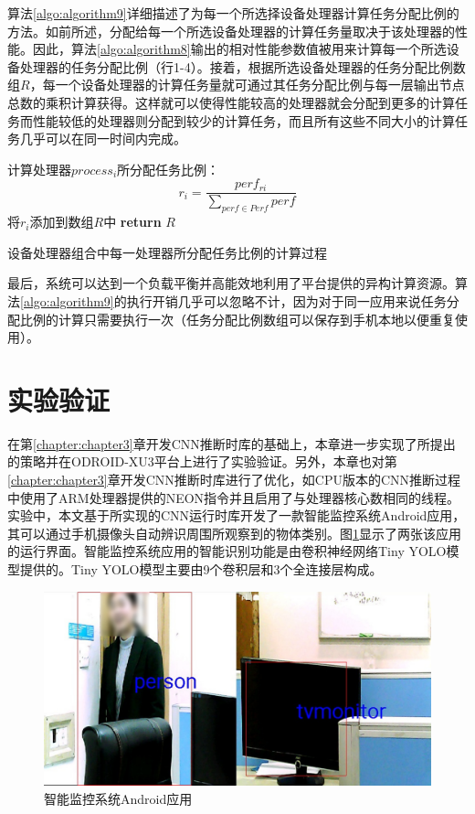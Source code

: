 算法\ref{algo:algorithm9}详细描述了为每一个所选择设备处理器计算任务分配比例的方法。如前所述，分配给每一个所选设备处理器的计算任务量取决于该处理器的性能。因此，算法\ref{algo:algorithm8}输出的相对性能参数值被用来计算每一个所选设备处理器的任务分配比例（行1-4）。接着，根据所选设备处理器的任务分配比例数组$R$，每一个设备处理器的计算任务量就可通过其任务分配比例与每一层输出节点总数的乘积计算获得。这样就可以使得性能较高的处理器就会分配到更多的计算任务而性能较低的处理器则分配到较少的计算任务，而且所有这些不同大小的计算任务几乎可以在同一时间内完成。

\begin{algorithm}[htbp]
  \small
  \SetAlgoLined
    \begin{spacing}{0.9}
     {
        计算处理器$process_i$所分配任务比例：
        $$r_i=\frac{perf_{ri}}{\sum_{perf \in Perf}perf}$$
        将$r_i$添加到数组$R$中\;
    }
    \textbf{return} $R$\;
   \end{spacing}
  \caption{设备处理器组合中每一处理器所分配任务比例的计算过程}
  \label{algo:algorithm9}
\end{algorithm}

最后，系统可以达到一个负载平衡并高能效地利用了平台提供的异构计算资源。算法\ref{algo:algorithm9}的执行开销几乎可以忽略不计，因为对于同一应用来说任务分配比例的计算只需要执行一次（任务分配比例数组可以保存到手机本地以便重复使用）。


\section{实验验证}

在第\ref{chapter:chapter3}章开发CNN推断时库的基础上，本章进一步实现了所提出的策略并在ODROID-XU3平台上进行了实验验证。另外，本章也对第\ref{chapter:chapter3}章开发CNN推断时库进行了优化，如CPU版本的CNN推断过程中使用了ARM处理器提供的NEON指令并且启用了与处理器核心数相同的线程。实验中，本文基于所实现的CNN运行时库开发了一款智能监控系统Android应用，其可以通过手机摄像头自动辨识周围所观察到的物体类别。图\ref{figure:figure31}显示了两张该应用的运行界面。智能监控系统应用的智能识别功能是由卷积神经网络Tiny YOLO\cite{pjreddie.com}模型提供的。Tiny YOLO模型主要由9个卷积层和3个全连接层构成。

\begin{figure}[htbp]
    \centering
    \includegraphics[height=0.4\textwidth]{figures/app.pdf}
    \caption{智能监控系统Android应用}\label{figure:figure31}
\end{figure}

